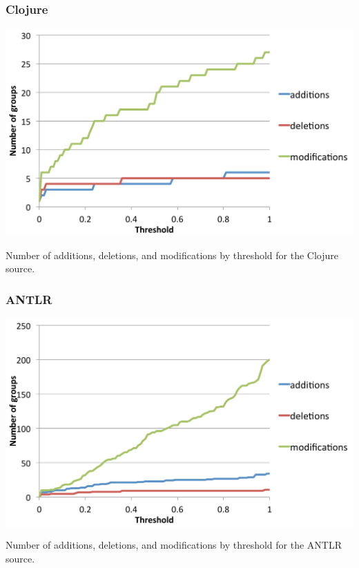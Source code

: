 \documentclass[ignorenonframetext,]{beamer}
\begin{document}
\begin{frame}\frametitle{Clojure}

\begin{center}
\includegraphics[width=\textwidth]{figures/clojure-number-of-modifications.pdf}


Number of additions, deletions, and modifications by threshold for the Clojure source.
\end{center}

\end{frame}

\begin{frame}\frametitle{ANTLR}

\begin{center}
\includegraphics[width=\textwidth]{figures/antlr-number-of-modifications.pdf}

Number of additions, deletions, and modifications by threshold for the ANTLR source.
\end{center}

\end{frame}
\end{document}
